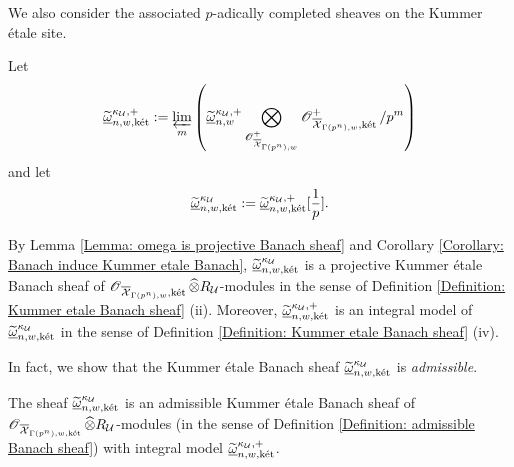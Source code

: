 We also consider the associated $p$-adically completed sheaves on the Kummer \'etale site.

\begin{Definition}
Let 
$$
\widetilde{\underline{\omega}}^{\kappa_{\operatorname{\mathcal{U}}},+}_{n,w,\operatorname{\textrm{k\'{e}t}}}:= \varprojlim_m\left(\widetilde{\underline{\omega}}^{\kappa_{\operatorname{\mathcal{U}}},+}_{n,w} \bigotimes_{\operatorname{\mathscr{O}}^+_{\overline{\operatorname{\mathcal{X}}}_{\Gamma(p^n),w}}}\operatorname{\mathscr{O}}^+_{\overline{\operatorname{\mathcal{X}}}_{\Gamma(p^n),w}, \operatorname{\textrm{k\'{e}t}}}/p^m\right)
$$
and let
$$
\widetilde{\underline{\omega}}^{\kappa_{\operatorname{\mathcal{U}}}}_{n,w,\operatorname{\textrm{k\'{e}t}}}:=\widetilde{\underline{\omega}}^{\kappa_{\operatorname{\mathcal{U}}},+}_{n,w,\operatorname{\textrm{k\'{e}t}}}[\frac{1}{p}].
$$
\end{Definition}

By Lemma \ref{Lemma: omega is projective Banach sheaf} and Corollary \ref{Corollary: Banach induce Kummer etale Banach}, $\widetilde{\underline{\omega}}^{\kappa_{\operatorname{\mathcal{U}}}}_{n,w,\operatorname{\textrm{k\'{e}t}}}$ is a projective Kummer \'etale Banach sheaf of $\operatorname{\mathscr{O}}_{\overline{\operatorname{\mathcal{X}}}_{\Gamma(p^n),w}, \operatorname{\textrm{k\'{e}t}}}\widehat{\otimes}R_{\operatorname{\mathcal{U}}}$-modules in the sense of Definition \ref{Definition: Kummer etale Banach sheaf} (ii). Moreover, $\widetilde{\underline{\omega}}^{\kappa_{\operatorname{\mathcal{U}}},+}_{n,w,\operatorname{\textrm{k\'{e}t}}}$ is an integral model of $\widetilde{\underline{\omega}}^{\kappa_{\operatorname{\mathcal{U}}}}_{n,w,\operatorname{\textrm{k\'{e}t}}}$ in the sense of Definition \ref{Definition: Kummer etale Banach sheaf} (iv).

In fact, we show that the Kummer \'etale Banach sheaf $\widetilde{\underline{\omega}}^{\kappa_{\operatorname{\mathcal{U}}}}_{n,w,\operatorname{\textrm{k\'{e}t}}}$ is \emph{admissible}.

\begin{Lemma}\label{Lemma: omega is admissible Kummer etale Banach sheaf}
The sheaf $\widetilde{\underline{\omega}}^{\kappa_{\operatorname{\mathcal{U}}}}_{n,w,\operatorname{\textrm{k\'{e}t}}}$ is an admissible Kummer \'etale Banach sheaf of $\operatorname{\mathscr{O}}_{\overline{\operatorname{\mathcal{X}}}_{\Gamma(p^n),w,\operatorname{\textrm{k\'{e}t}}}}\widehat{\otimes}R_{\operatorname{\mathcal{U}}}$-modules (in the sense of Definition \ref{Definition: admissible Banach sheaf}) with integral model $\widetilde{\underline{\omega}}^{\kappa_{\operatorname{\mathcal{U}}},+}_{n,w,\operatorname{\textrm{k\'{e}t}}}$.
\end{Lemma}

